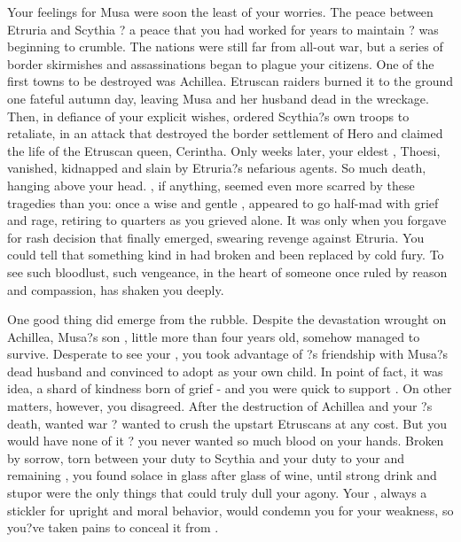 \documentclass[char]{Kos}
\begin{document}
    Your feelings for Musa were soon the least of your worries. The peace between Etruria and Scythia ? a peace that you had worked for years to maintain ? was beginning to crumble. The nations were still far from all-out war, but a series of border skirmishes and assassinations began to plague your citizens. One of the first towns to be destroyed was Achillea. Etruscan raiders burned it to the ground one fateful autumn day, leaving Musa and her husband dead in the wreckage. Then, in defiance of your explicit wishes, \cScythiaQueen{\Monarch} \cScythiaQueen{} ordered Scythia?s own troops to retaliate, in an attack that destroyed the border settlement of Hero and claimed the life of the Etruscan queen, Cerintha. Only weeks later, your eldest \cFugitive{\offspring}, Thoesi, vanished, kidnapped and slain by Etruria?s nefarious agents. So much death, hanging above your head. \cScythiaQueen{}, if anything, seemed even more scarred by these tragedies than you: once a wise and gentle \cScythiaQueen{\human}, \cScythiaQueen{\they} appeared to go half-mad with grief and rage, retiring to \cScythiaQueen{\their} quarters as you grieved alone. It was only when you forgave \cScythiaQueen{\them} for \cScythiaQueen{\their} rash decision that \cScythiaQueen{\they} finally emerged, swearing revenge against Etruria. You could tell that something kind in \cScythiaQueen{\them} had broken and been replaced by cold fury. To see such bloodlust, such vengeance, in the heart of someone once ruled by reason and compassion, has shaken you deeply.

    One good thing did emerge from the rubble. Despite the devastation wrought on Achillea, Musa?s son \cWard{}, little more than four years old, somehow managed to survive. Desperate to see your \cWard{\offspring}, you took advantage of \cScythiaQueen{}?s friendship with Musa?s dead husband and convinced \cScythiaQueen{\them} to adopt \cWard{} as your own child. In point of fact, it was \cScythiaQueen{\their} idea, a shard of kindness born of grief - and you were quick to support \cScythiaQueen{\them}. On other matters, however, you disagreed. After the destruction of Achillea and your \cFugitive{\offspring}?s death, \cScythiaQueen{} wanted war ? wanted to crush the upstart Etruscans at any cost. But you would have none of it ? you never wanted so much blood on your hands. Broken by sorrow, torn between your duty to Scythia and your duty to your \cScythiaQueen{\spouse} and remaining \cBride{\offspring}, you found solace in glass after glass of wine, until strong drink and stupor were the only things that could truly dull your agony. Your \cScythiaQueen{\spouse}, always a stickler for upright and moral behavior, would condemn you for your weakness, so you?ve taken pains to conceal it from \cScythiaQueen{\them}.
\end{document}
